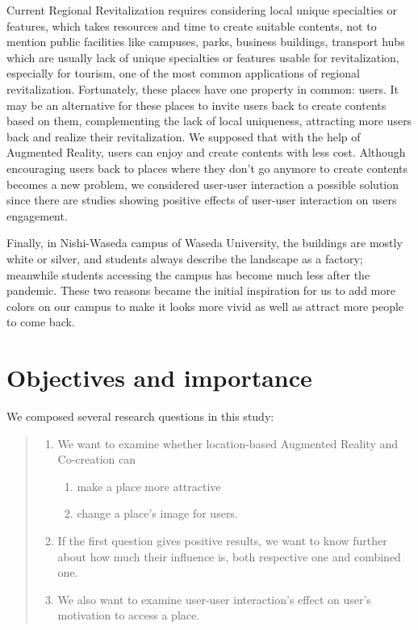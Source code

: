 Current Regional Revitalization requires considering local unique \cite{prime_minister_of_japan_and_his_cabinet_2014} specialties or features, which takes resources and time to create suitable contents,
not to mention public facilities like campuses, parks, business buildings, transport hubs which are usually lack of unique specialties or features usable for revitalization,
especially for tourism, one of the most common applications of regional revitalization.
Fortunately, these places have one property in common: users. It may be an alternative for these places to invite users back to create contents based on them,
complementing the lack of local uniqueness, attracting more users back and realize their revitalization.
We supposed that with the help of Augmented Reality, users can enjoy and create contents with less cost.
Although encouraging users back to places where they don't go anymore to create contents becomes a new problem,
we considered user-user interaction a possible solution since there are studies showing positive effects of user-user interaction on users engagement.


Finally, in Nishi-Waseda campus of Waseda University, the buildings are mostly white or silver, and students always describe the landscape as a factory; meanwhile students accessing the campus has become much less after the pandemic.
These two reasons became the initial inspiration for us to add more colors on our campus to make it looks more vivid as well as attract more people to come back.

\section{Objectives and importance}


We composed several research questions in this study:
\begin{quote}
  \begin{enumerate}
    \item We want to examine whether location-based Augmented Reality and Co-creation can
      \begin{enumerate}
        \item make a place more attractive
        \item change a place's image for users.
      \end{enumerate}
    \item If the first question gives positive results, we want to know further about how much their influence is, both respective one and combined one.
    \item We also want to examine user-user interaction's effect on user's motivation to access a place.
  \end{enumerate}
\end{quote}

